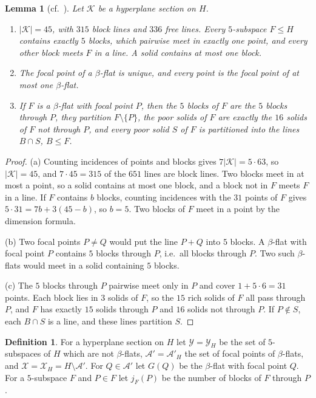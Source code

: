 \documentclass[11pt]{amsart}
\newtheorem{lemma}[theorem]{Lemma}
\theoremstyle{definition}
\newtheorem{definition}[theorem]{Definition}
\newcommand{\K}{\mathcal{K}}
\newcommand{\X}{\mathcal{X}}
\newcommand{\Y}{\mathcal{Y}}
\newcommand{\A}{\mathcal{A}}
\begin{document}
\begin{lemma}[cf.\ {\cite[Lemmas~3.2--3.4]{Kie22}}]\label{lem:dh}
Let $\K$ be a hyperplane section on $H$.
\begin{enumerate}[label=(\alph*)]
\item $|\K|=45$, with $315$ block lines and $336$ free lines. Every $5$-subspace $F\le H$ contains exactly $5$ blocks, which pairwise meet in exactly one point, and every other block meets $F$ in a line. A solid contains at most one block.
\item The focal point of a $\beta$-flat is unique, and every point is the focal point of at most one $\beta$-flat.
\item If $F$ is a $\beta$-flat with focal point $P$, then the $5$ blocks of $F$ are the $5$ blocks through $P$, they partition $F\setminus\{P\}$, the poor solids of $F$ are exactly the $16$ solids of $F$ not through $P$, and every poor solid $S$ of $F$ is partitioned into the lines $B\cap S$, $B\le F$.
\end{enumerate}
\end{lemma}
\begin{proof}
(a) Counting incidences of points and blocks gives $7|\K|=5\cdot63$, so $|\K|=45$, and $7\cdot45=315$ of the $651$ lines are block lines. Two blocks meet in at most a point, so a solid contains at most one block, and a block not in $F$ meets $F$ in a line. If $F$ contains $b$ blocks, counting incidences with the $31$ points of $F$ gives $5\cdot31=7b+3(45-b)$, so $b=5$. Two blocks of $F$ meet in a point by the dimension formula.

(b) Two focal points $P\ne Q$ would put the line $P+Q$ into $5$ blocks. A $\beta$-flat with focal point $P$ contains $5$ blocks through $P$, i.e.\ all blocks through $P$. Two such $\beta$-flats would meet in a solid containing $5$ blocks.

(c) The $5$ blocks through $P$ pairwise meet only in $P$ and cover $1+5\cdot6=31$ points. Each block lies in $3$ solids of $F$, so the $15$ rich solids of $F$ all pass through $P$, and $F$ has exactly $15$ solids through $P$ and $16$ solids not through $P$. If $P\notin S$, each $B\cap S$ is a line, and these lines partition $S$.
\end{proof}

\begin{definition}
For a hyperplane section on $H$ let $\Y=\Y_H$ be the set of $5$-subspaces of $H$ which are not $\beta$-flats, $\A'=\A'_H$ the set of focal points of $\beta$-flats, and $\X=\X_H=H\setminus\A'$. For $Q\in\A'$ let $G(Q)$ be the $\beta$-flat with focal point $Q$. For a $5$-subspace $F$ and $P\in F$ let $j_F(P)$ be the number of blocks of $F$ through $P$.
\end{definition}
\end{document}
